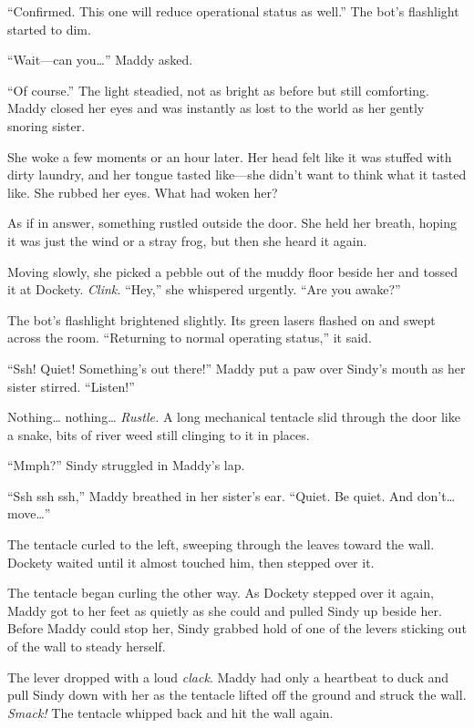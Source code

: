 \documentclass[10pt]{article}
\begin{document}
``Confirmed. This one will reduce operational status as well.'' The
bot's flashlight started to dim.

``Wait---can you\ldots{}'' Maddy asked.

``Of course.'' The light steadied, not as bright as before but still
comforting. Maddy closed her eyes and was instantly as lost to the world
as her gently snoring sister.

She woke a few moments or an hour later. Her head felt like it was
stuffed with dirty laundry, and her tongue tasted like---she didn't want
to think what it tasted like. She rubbed her eyes. What had woken her?

As if in answer, something rustled outside the door. She held her
breath, hoping it was just the wind or a stray frog, but then she heard
it again.

Moving slowly, she picked a pebble out of the muddy floor beside her and
tossed it at Dockety. \emph{Clink.} ``Hey,'' she whispered urgently.
``Are you awake?''

The bot's flashlight brightened slightly. Its green lasers flashed on
and swept across the room. ``Returning to normal operating status,'' it
said.

``Ssh! Quiet! Something's out there!'' Maddy put a paw over Sindy's
mouth as her sister stirred. ``Listen!''

Nothing\ldots{} nothing\ldots{} \emph{Rustle.} A long mechanical
tentacle slid through the door like a snake, bits of river weed still
clinging to it in places.

``Mmph?'' Sindy struggled in Maddy's lap.

``Ssh ssh ssh,'' Maddy breathed in her sister's ear. ``Quiet. Be quiet.
And don't\ldots{} move\ldots{}''

The tentacle curled to the left, sweeping through the leaves toward the
wall. Dockety waited until it almost touched him, then stepped over it.

The tentacle began curling the other way. As Dockety stepped over it
again, Maddy got to her feet as quietly as she could and pulled Sindy up
beside her. Before Maddy could stop her, Sindy grabbed hold of one of
the levers sticking out of the wall to steady herself.

The lever dropped with a loud \emph{clack}. Maddy had only a heartbeat
to duck and pull Sindy down with her as the tentacle lifted off the
ground and struck the wall. \emph{Smack!} The tentacle whipped back and
hit the wall again.
\end{document}
